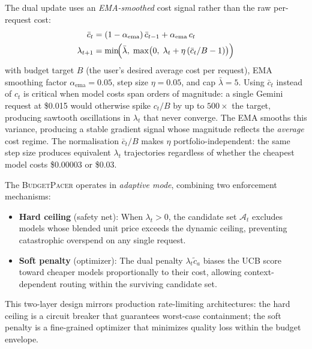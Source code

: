 The dual update uses an \emph{EMA-smoothed} cost signal rather than
the raw per-request cost:
\begin{align}
    \bar{c}_t &= (1 - \alpha_{\mathrm{ema}})\,\bar{c}_{t-1}
                 + \alpha_{\mathrm{ema}}\,c_t
    \label{eq:cost_ema} \\
    \lambda_{t+1} &= \min\!\Bigl(\bar\lambda,\;
    \max\bigl(0,\;\lambda_t + \eta\,(\bar{c}_t / B - 1)\bigr)\Bigr)
    \label{eq:dual_update}
\end{align}
with budget target $B$ (the user's desired average cost per request),
EMA smoothing factor $\alpha_{\mathrm{ema}}{=}0.05$,
step size $\eta{=}0.05$, and cap $\bar\lambda{=}5$.
Using $\bar{c}_t$ instead of $c_t$ is critical when model costs span
orders of magnitude: a single Gemini request at \$0.015 would
otherwise spike $c_t/B$ by up to $500\times$ the target, producing
sawtooth oscillations in $\lambda_t$ that never converge.
The EMA smooths this variance, producing a stable gradient signal
whose magnitude reflects the \emph{average} cost regime.
The normalisation $\bar{c}_t / B$ makes $\eta$ portfolio-independent:
the same step size produces equivalent $\lambda_t$ trajectories regardless
of whether the cheapest model costs \$0.00003 or \$0.03.

The \textsc{BudgetPacer} operates in \emph{adaptive mode}, combining
two enforcement mechanisms:
\begin{itemize}[nosep,leftmargin=*]
  \item \textbf{Hard ceiling} (safety net):
    When $\lambda_t > 0$, the candidate set $\mathcal{A}_t$ excludes
    models whose blended unit price exceeds the dynamic ceiling,
    preventing catastrophic overspend on any single request.
  \item \textbf{Soft penalty} (optimizer):
    The dual penalty $\lambda_t\tilde{c}_a$ biases the UCB score toward
    cheaper models proportionally to their cost, allowing context-dependent
    routing within the surviving candidate set.
\end{itemize}

\noindent
This two-layer design mirrors production rate-limiting architectures:
the hard ceiling is a circuit breaker that guarantees worst-case
containment; the soft penalty is a fine-grained optimizer that
minimizes quality loss within the budget envelope.

